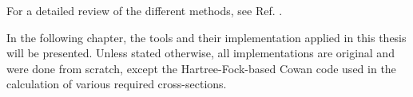 For a detailed review of the different methods, see Ref. \cite{Fennel2010}.

In the following chapter, the tools and their implementation applied in this
thesis will be presented. Unless stated otherwise, all implementations are original
and were done from scratch, except the Hartree-Fock-based Cowan code\cite{CowanCode} used
in the calculation of various required cross-sections.


